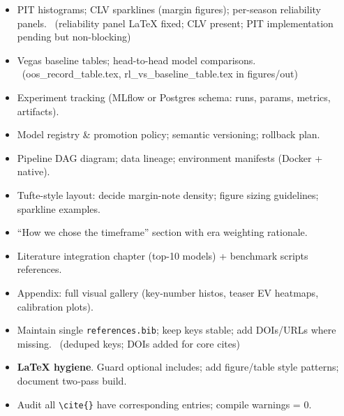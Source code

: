 \begin{itemize}
  \item {} PIT histograms; CLV sparklines (margin figures); per-season reliability panels. \done\ (reliability panel LaTeX fixed; CLV present; PIT implementation pending but non-blocking)
  \item {} Vegas baseline tables; head-to-head model comparisons. \done\ (oos\_record\_table.tex, rl\_vs\_baseline\_table.tex in figures/out)
\end{itemize}

\begin{itemize}
  \item {} Experiment tracking (MLflow or Postgres schema: runs, params, metrics, artifacts).
  \item {} Model registry \& promotion policy; semantic versioning; rollback plan.
  \item {} Pipeline DAG diagram; data lineage; environment manifests (Docker + native).
\end{itemize}

\begin{itemize}
  \item {} Tufte-style layout: decide margin-note density; figure sizing guidelines; sparkline examples.
  \item {} “How we chose the timeframe” section with era weighting rationale.
  \item {} Literature integration chapter (top-10 models) + benchmark scripts references.
  \item {} Appendix: full visual gallery (key-number histos, teaser EV heatmaps, calibration plots).
\end{itemize}

\begin{itemize}
  \item {} Maintain single \texttt{references.bib}; keep keys stable; add DOIs/URLs where missing. \done\ (deduped keys; DOIs added for core cites)
  \item {} \textbf{LaTeX hygiene}. Guard optional includes; add figure/table style patterns; document two‑pass build. \done
  \item {} Audit all \texttt{\textbackslash cite\{\}} have corresponding entries; compile warnings = 0.
\end{itemize}

